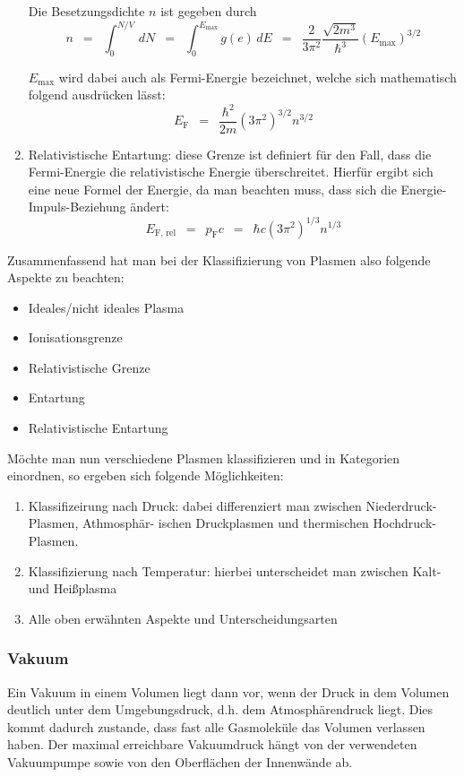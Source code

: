 \documentclass{article}
\newcommand{\widespace}{\enspace}
\newcommand{\wideeq}{\widespace = \widespace}
\begin{document}
\begin{enumerate}
    Die Besetzungsdichte $n$ ist gegeben durch
    \[
        n \wideeq \int_{0}^{N/V} \, dN
        \wideeq \int_{0}^{E_\text{max}} g(e) \,dE
        \wideeq \frac{2}{3\pi^2} \frac{\sqrt{2m^3}}{\hbar^3} (E_\text{max})^{3/2}
    \]

    $E_\text{max}$ wird dabei auch als Fermi-Energie bezeichnet, welche sich mathematisch folgend ausdrücken lässt:
    \[
        E_\text{F} \wideeq \frac{\hbar^2}{2m} (3\pi^2)^{3/2} n^{3/2}
    \]

    \item Relativistische Entartung: diese Grenze ist definiert für den Fall, dass die Fermi-Energie die relativistische Energie überschreitet. Hierfür ergibt sich eine neue Formel der Energie, da man beachten muss, dass sich die Energie-Impuls-Beziehung ändert:
    \[
        E_\text{F, rel} \wideeq p_\text{F} c \wideeq \hbar c (3\pi^2)^{1/3} n^{1/3}
    \]
    
\end{enumerate}

Zusammenfassend hat man bei der Klassifizierung von Plasmen also folgende Aspekte zu beachten:
\begin{itemize}
    \item Ideales/nicht ideales Plasma
    \item Ionisationsgrenze
    \item Relativistische Grenze
    \item Entartung
    \item Relativistische Entartung
\end{itemize}

Möchte man nun verschiedene Plasmen klassifizieren und in Kategorien einordnen, so ergeben sich folgende Möglichkeiten:
\begin{enumerate}
    \item Klassifizeirung nach Druck: dabei differenziert man zwischen Niederdruck-Plasmen, Athmosphär- ischen Druckplasmen und thermischen Hochdruck-Plasmen.
    \item Klassifizierung nach Temperatur: hierbei unterscheidet man zwischen Kalt- und Heißplasma
    \item Alle oben erwähnten Aspekte und Unterscheidungsarten
\end{enumerate}


\subsubsection{Vakuum}

Ein Vakuum in einem Volumen liegt dann vor, wenn der Druck in dem Volumen
deutlich unter dem Umgebungsdruck, d.h. dem Atmosphärendruck liegt.
Dies kommt dadurch zustande, dass fast alle Gasmoleküle das Volumen verlassen
haben. Der maximal erreichbare Vakuumdruck hängt von der verwendeten Vakuumpumpe
sowie von den Oberflächen der Innenwände ab.
\end{document}
